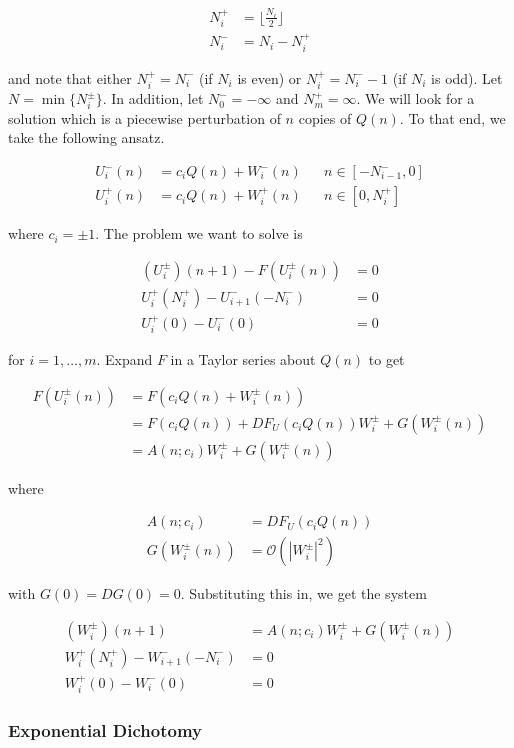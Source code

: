 \documentclass[12pt]{article}
\begin{document}
\begin{align*}
N_i^+ &= \lfloor \frac{N_i}{2} \rfloor \\
N_i^- &= N_i - N_i^+
\end{align*}

and note that either $N_i^+ = N_i^-$ (if $N_i$ is even) or $N_i^+ = N_i^- - 1$ (if $N_i$ is odd). Let $N = \min\{ N_i^\pm \}$. In addition, let $N_0^- = -\infty$ and $N_m^+ = \infty$. We will look for a solution which is a piecewise perturbation of $n$ copies of $Q(n)$. To that end, we take the following ansatz.

\begin{align*}
U_i^-(n) &= c_i Q(n) + W_i^-(n) && n \in [-N_{i-1}^-, 0] \\
U_i^+(n) &= c_i Q(n) + W_i^+(n) && n \in [0, N_i^+]
\end{align*}

where $c_i = \pm 1$. The problem we want to solve is

\begin{align}
(U_i^\pm)(n+1) - F(U_i^\pm(n)) &= 0 \\
U_i^+(N_i^+) - U_{i+1}^-(-N_i^-) &= 0 \\
U_i^+(0) - U_i^-(0) &= 0
\end{align}

for $i = 1, \dots, m$. Expand $F$ in a Taylor series about $Q(n)$ to get

\begin{align*}
F(U_i^\pm(n)) &= F(c_i Q(n) + W_i^\pm(n)) \\
&= F(c_i Q(n)) + DF_{U}(c_i Q(n)) W_i^\pm + G(W_i^\pm(n)) \\
&= A(n; c_i) W_i^\pm + G(W_i^\pm(n))
\end{align*}

where

\begin{align*}
A(n; c_i) &= DF_{U}(c_i Q(n))\\
G(W_i^\pm(n)) &= \mathcal{O}(|W_i^\pm|^2)
\end{align*}

with $G(0) = DG(0) = 0$. Substituting this in, we get the system

\begin{align}
(W_i^\pm)(n+1) &= A(n; c_i) W_i^\pm + G(W_i^\pm(n)) \\
W_i^+(N_i^+) - W_{i+1}^-(-N_i^-) &= 0 \\
W_i^+(0) - W_i^-(0) &= 0
\end{align}

\subsubsection{Exponential Dichotomy}
\end{document}
